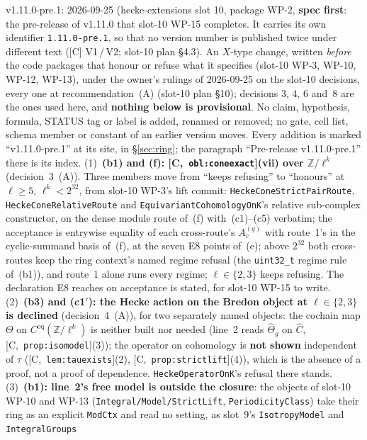\documentclass[11pt]{article}
\theoremstyle{remark}
\newcommand{\Z}{\mathbb{Z}}
\newcommand{\HA}[1]{[C,~\texttt{#1}]}      %
\begin{document}
v1.11.0-pre.1: 2026-09-25 (hecke-extensions slot 10, package WP-2, \textbf{spec
first}: the pre-release of v1.11.0 that slot-10 WP-15 completes. It carries its own identifier
\texttt{1.11.0-pre.1}, so that no version number is published twice under different text ([C]
V1\,/\,V2; slot-10 plan \S4.3). An $X$-type change, written \emph{before} the code packages that
honour or refuse what it specifies (slot-10 WP-3, WP-10, WP-12, WP-13), under the owner's rulings
of 2026-09-25 on the slot-10 decisions, every one at recommendation~(A) (slot-10 plan \S10);
decisions 3, 4, 6 and~8 are the ones used here, and \textbf{nothing below is provisional}. No claim,
hypothesis, formula, STATUS tag or label is added, renamed or removed; no gate, cell list, schema
member or constant of an earlier version moves. Every addition is marked ``v1.11.0-pre.1'' at its
site, in \S\ref{sec:ring}; the paragraph ``Pre-release v1.11.0-pre.1'' there is its index.
(1)~\textbf{(b1) and (f): \HA{obl:coneexact}(vii) over $\Z/\ell^k$} (decision~3~(A)). Three members
move from ``keeps refusing'' to ``honours'' at $\ell\ge5$, $\ell^k<2^{32}$, from slot-10 WP-3's
lift commit: \texttt{HeckeConeStrictPairRoute}, \texttt{HeckeConeRelativeRoute} and
\texttt{EquivariantCohomologyOnK}'s relative sub-complex constructor, on the dense module route
of~(f) with~(c1)--(c5) verbatim; the acceptance is entrywise equality of each cross-route's
$A_c^{(q)}$ with route~1's in the cyclic-summand basis of~(f), at the seven E8 points of~(e); above
$2^{32}$ both cross-routes keep the ring context's named regime refusal (the \texttt{uint32\_t}
regime rule of~(b1)), and route~1 alone runs every regime; $\ell\in\{2,3\}$ keeps refusing. The
declaration E8 reaches on acceptance is stated, for slot-10 WP-15 to write.
(2)~\textbf{(b3) and (c1$'$): the Hecke action on the Bredon object at $\ell\in\{2,3\}$ is
declined} (decision~4~(A)), for two separately named objects: the cochain map $\Theta$ on
$C^{\mathrm{eq}}(\Z/\ell^k)$ is neither built nor needed (line~2 reads $\widehat\Theta_g$ on
$\widehat C$, \HA{prop:isomodel}(3)); the operator on cohomology is \textbf{not shown} independent
of $\tau$ (\HA{lem:tauexists}(2), \HA{prop:strictlift}(4)), which is the absence of a proof, not a
proof of dependence. \texttt{HeckeOperatorOnK}'s refusal there stands.
(3)~\textbf{(b1): line~2's free model is outside the closure}: the objects of slot-10 WP-10 and
WP-13 (\texttt{Integral/Model/StrictLift}, \texttt{PeriodicityClass}) take their ring as an explicit
\texttt{ModCtx} and read no setting, as slot~9's \texttt{IsotropyModel} and \texttt{IntegralGroups}
\end{document}
